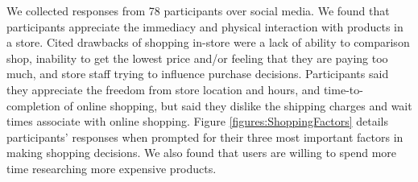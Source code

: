 We collected responses from 78 participants over social media.  We found that participants appreciate the immediacy and physical interaction with products in a store.  Cited drawbacks of shopping in-store were a lack of ability to comparison shop, inability to get the lowest price and/or feeling that they are paying too much, and store staff trying to influence purchase decisions.  Participants said they appreciate the freedom from store location and hours,  and time-to-completion of online shopping,  but said they dislike the shipping charges and wait times associate with online shopping.  Figure \ref{figures:ShoppingFactors} details participants' responses when prompted for their three most important factors in making shopping decisions.  We also found that users are willing to spend more time researching more expensive products.
